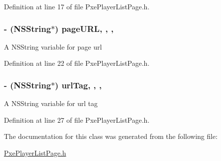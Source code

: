 Definition at line 17 of file Pxe\-Player\-List\-Page.\-h.

\hypertarget{interface_pxe_player_list_page_a1cc9ccb5cb6469d229ec0d504ce70d21}{
\subsubsection[{page\-U\-R\-L}]{\setlength{\rightskip}{0pt plus 5cm}-\/ (N\-S\-String$\ast$) page\-U\-R\-L\hspace{0.3cm}{\ttfamily [read]}, {\ttfamily [write]}, {\ttfamily [nonatomic]}, {\ttfamily [retain]}}}\label{interface_pxe_player_list_page_a1cc9ccb5cb6469d229ec0d504ce70d21}
A N\-S\-String variable for page url 

Definition at line 22 of file Pxe\-Player\-List\-Page.\-h.

\hypertarget{interface_pxe_player_list_page_a6ae590b4ac2d96af1bdc01b6ff1c5ce7}{
\subsubsection[{url\-Tag}]{\setlength{\rightskip}{0pt plus 5cm}-\/ (N\-S\-String$\ast$) url\-Tag\hspace{0.3cm}{\ttfamily [read]}, {\ttfamily [write]}, {\ttfamily [nonatomic]}, {\ttfamily [retain]}}}\label{interface_pxe_player_list_page_a6ae590b4ac2d96af1bdc01b6ff1c5ce7}
A N\-S\-String variable for url tag 

Definition at line 27 of file Pxe\-Player\-List\-Page.\-h.



The documentation for this class was generated from the following file\-:\begin{DoxyCompactItemize}
\item 
\hyperlink{_pxe_player_list_page_8h}{Pxe\-Player\-List\-Page.\-h}\end{DoxyCompactItemize}
